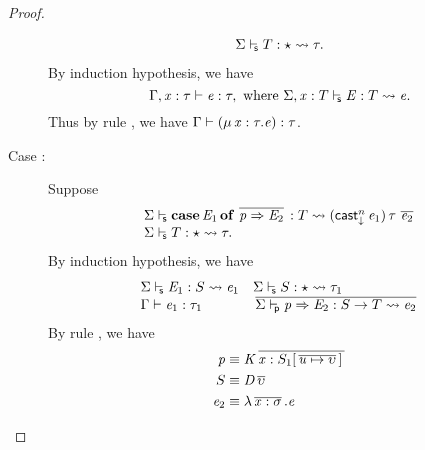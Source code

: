 \begin{proof}
\begin{description}
\[\begin{array}{l}
                     \Sigma  \vdash_{\!\!\mathsf{s} }  T  :  \star   \rightsquigarrow   \tau . 
                \end{array}\]
            By induction hypothesis, we have 
                \[ \Gamma  ,  \mathit{x}  :  \tau  \vdash  \mathit{e}  :  \tau,\text{ where } \Sigma  ,  \mathit{x}  :  T  \vdash_{\!\!\mathsf{s} }  \mathit{E}  :  T   \rightsquigarrow   \mathit{e} . \] 
            Thus by rule , we have $\Gamma  \vdash  (  \mu \, \mathit{x}  :  \tau  .  \mathit{e}  )  :  \tau$.
        \item[Case \ruleref{TR\_Case}:] Suppose 
            \[\begin{array}{l}
                 \Sigma  \vdash_{\!\!\mathsf{s} }  \mathbf{case} \, \mathit{E_{{\mathrm{1}}}} \, \mathbf{of} \, \,\overline{  \mathit{p}  \Rightarrow  \mathit{E_{{\mathrm{2}}}}  }\,  :  T   \rightsquigarrow   (  \mathsf{cast}_{\downarrow}^n \, \mathit{e_{{\mathrm{1}}}}  ) \, \tau \, \,\overline{  \mathit{e_{{\mathrm{2}}}}  }\,  \\
                 \Sigma  \vdash_{\!\!\mathsf{s} }  T  :  \star   \rightsquigarrow   \tau .
            \end{array}\]
            By induction hypothesis, we have 
            \[\begin{array}{ll}
                 \Sigma  \vdash_{\!\!\mathsf{s} }  \mathit{E_{{\mathrm{1}}}}  :  S   \rightsquigarrow   \mathit{e_{{\mathrm{1}}}}  &
                 \Sigma  \vdash_{\!\!\mathsf{s} }  S  :  \star   \rightsquigarrow   \tau_{{\mathrm{1}}}  \\
                \Gamma  \vdash  \mathit{e_{{\mathrm{1}}}}  :  \tau_{{\mathrm{1}}} &
                \,\overline{   \Sigma  \vdash_{\!\!\mathsf{p} }  \mathit{p}   \Rightarrow   \mathit{E_{{\mathrm{2}}}}  :  S   \rightarrow   T   \rightsquigarrow   \mathit{e_{{\mathrm{2}}}}   }\,            
            \end{array}\]
            By rule , we have
            \begin{align*}
                \ottnt{p} & \equiv  \ottmv{K}  \,\overline{  \ottmv{x}  \ottsym{:}  S_{{\mathrm{1}}}  \ottsym{[}  \,\overline{  \ottnt{u}  \mapsto  \upsilon  }\,  \ottsym{]} \,  }\, \\
                S & \equiv  \ottmv{D}    \,\overline{  \upsilon  }\, \\
                \ottnt{e_{{\mathrm{2}}}} & \equiv  \lambda  \,\overline{  \ottmv{x}  \ottsym{:}  \sigma  }\,  \ottsym{.}  \ottnt{e}

\end{align*}
\end{description}
\end{proof}
